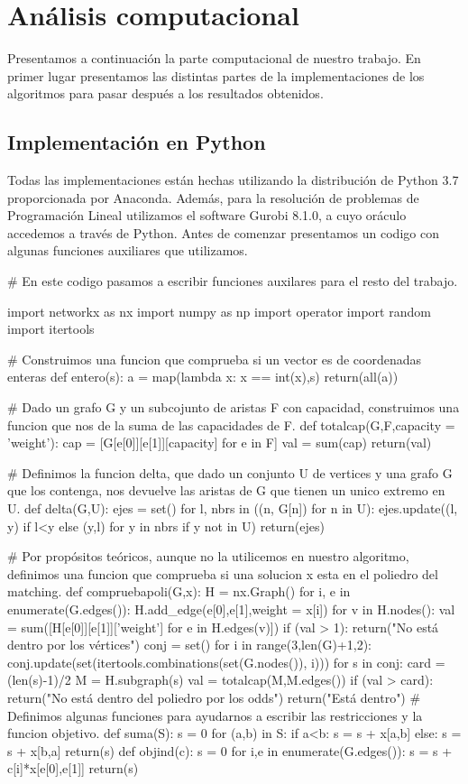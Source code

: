 \documentclass[twoside,a4paper,openright,12pt,tikz]{book}
\begin{document}
\chapter{Análisis computacional}
Presentamos a continuación la parte computacional de nuestro trabajo. En primer lugar presentamos las distintas partes de la implementaciones de los algoritmos para pasar después a los resultados obtenidos.
\section{Implementación en Python}
Todas las implementaciones están hechas utilizando la distribución de Python 3.7 proporcionada por Anaconda. Además, para la resolución de problemas de Programación Lineal utilizamos el software Gurobi 8.1.0, a cuyo oráculo accedemos a través de Python. Antes de comenzar presentamos un codigo con algunas funciones auxiliares que utilizamos.
\begin{pythone}
# En este codigo pasamos a escribir funciones auxilares para el resto del trabajo.

import networkx as nx
import numpy as np
import operator
import random 
import itertools

# Construimos una funcion que comprueba si un vector es de coordenadas enteras
def entero(s):
    a = map(lambda x: x == int(x),s)
    return(all(a))
    
# Dado un grafo G y un subcojunto de aristas F con capacidad, construimos una funcion que nos de la suma de las capacidades de F.
def totalcap(G,F,capacity = 'weight'):
    cap = [G[e[0]][e[1]][capacity] for e in F]
    val = sum(cap)
    return(val)

# Definimos la funcion delta, que dado un conjunto U de vertices y una grafo G que los contenga, nos devuelve las aristas de G que tienen un unico extremo en U.
def delta(G,U):
    ejes = set()
    for l, nbrs in ((n, G[n]) for n in U):
        ejes.update((l, y) if l<y else (y,l) for y in nbrs if y not in U)
    return(ejes)
    
# Por propósitos teóricos, aunque no la utilicemos en nuestro algoritmo, definimos una funcion que comprueba si una solucion x esta en el poliedro del matching.
def compruebapoli(G,x):
    H = nx.Graph()
    for i, e in enumerate(G.edges()):
        H.add_edge(e[0],e[1],weight = x[i])
    for v in H.nodes():
        val = sum([H[e[0]][e[1]]['weight'] for e in H.edges(v)])
        if (val > 1):
            return("No está dentro por los vértices") 
    conj = set()
    for i in range(3,len(G)+1,2):
        conj.update(set(itertools.combinations(set(G.nodes()), i)))
    for s in conj:
        card = (len(s)-1)/2
        M = H.subgraph(s)
        val = totalcap(M,M.edges())
        if (val > card):
            return("No está dentro del poliedro por los odds")
    return("Está dentro")
# Definimos algunas funciones para ayudarnos a escribir las restricciones y la funcion objetivo.
def suma(S):
	s = 0
    for (a,b) in S:
        if a<b:
            s = s + x[a,b]
		else:
            s = s + x[b,a]
        return(s)
def objind(c):
    s = 0
	for i,e in enumerate(G.edges()):
    	s = s + c[i]*x[e[0],e[1]] 
    return(s)
\end{pythone}
\end{document}

